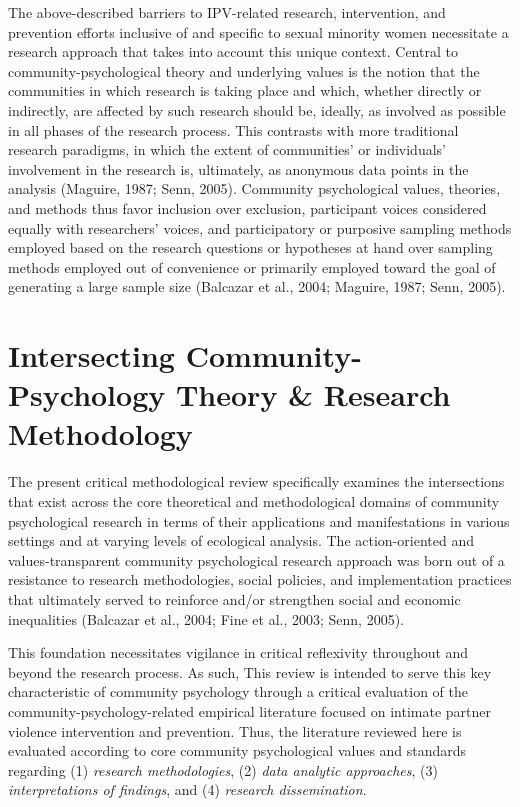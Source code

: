 \documentclass[11pt,]{tufte-book}
\begin{document}
The above-described barriers to IPV-related research, intervention, and
prevention efforts inclusive of and specific to sexual minority women
necessitate a research approach that takes into account this unique
context. Central to community-psychological theory and underlying values
is the notion that the communities in which research is taking place and
which, whether directly or indirectly, are affected by such research
should be, ideally, as involved as possible in all phases of the
research process. This contrasts with more traditional research
paradigms, in which the extent of communities' or individuals'
involvement in the research is, ultimately, as anonymous data points in
the analysis (Maguire, 1987; Senn, 2005). Community psychological
values, theories, and methods thus favor inclusion over exclusion,
participant voices considered equally with researchers' voices, and
participatory or purposive sampling methods employed based on the
research questions or hypotheses at hand over sampling methods employed
out of convenience or primarily employed toward the goal of generating a
large sample size (Balcazar et al., 2004; Maguire, 1987; Senn, 2005).

\section{Intersecting Community-Psychology Theory \& Research
Methodology}\label{intersecting-community-psychology-theory-research-methodology}

The present critical methodological review specifically examines the
intersections that exist across the core theoretical and methodological
domains of community psychological research in terms of their
applications and manifestations in various settings and at varying
levels of ecological analysis. The action-oriented and
values-transparent community psychological research approach was born
out of a resistance to research methodologies, social policies, and
implementation practices that ultimately served to reinforce and/or
strengthen social and economic inequalities (Balcazar et al., 2004; Fine
et al., 2003; Senn, 2005).

This foundation necessitates vigilance in critical reflexivity
throughout and beyond the research process. As such, This review is
intended to serve this key characteristic of community psychology
through a critical evaluation of the community-psychology-related
empirical literature focused on intimate partner violence intervention
and prevention. Thus, the literature reviewed here is evaluated
according to core community psychological values and standards regarding
(1) \emph{research methodologies}, (2) \emph{data analytic approaches},
(3) \emph{interpretations of findings}, and (4) \emph{research
dissemination}.
\end{document}

